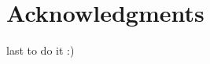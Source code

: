 \documentclass[french,book,nopubpage,nodocumentinfo]{upmethodology-document}
\makeatletter
\def\cleardoublepage{\clearpage\if@twoside \ifodd\c@page\else%
  \hbox{}%
  \thispagestyle{empty}%
  \newpage%
  \if@twocolumn\hbox{}\newpage\fi\fi\fi}
\makeatother
\begin{document}
\cleardoublepage

\section*{Acknowledgments}
last to do it :)
\tableofcontents


\mainmatter


\label{thesis}





%
%







\end{document}
